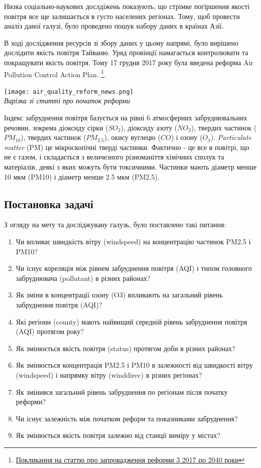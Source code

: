 \documentclass{article}
\begin{document}
Низка соціально-наукових дослдіжень показують, що стрімке погіршення якості повітря все ще залишається в густо населених регіонах. Тому, щоб провести аналіз даної галузі, було проведено пошук набору даних в країнах Азії. 

В ході дослідження ресурсів зі збору даних у цьому напрямі, було вирішено дослідити якість повітря Тайваню. Уряд провінції намагається контролювати та покращувати якість повітря. Тому 17 грудня 2017 року була введена  реформа Air Pollution Control Action Plan. \footnote{\href{https://e-info.org.tw/node/209138}{Покликання на статтю про запровадження реформи 3 2017 по 2040 роки}}.

\begin{center}
    \texttt{[image: air\_quality\_reform\_news.png]}\\
    \textit{Вирізка зі статті про початок реформи}
\end{center}

Індекс забруднення повітря базується на рівні 6 атмосферних забруднювальних речовин, зокрема діоксиду сірки ($SO_2$), діоксиду азоту ($NO_2$), твердих частинок ($PM_{10}$), твердих частинок ($PM_{2.5}$), окису вуглецю ($CO$) і озону ($O_3$). 
\textit{Particulate matter} (PM) це мікроскопічні тверді частинки. Фактично - це все в повітрі, що не є газом, і складається з величезного різноманіття хімічних сполук та матеріалів, деякі з яких можуть бути токсичними. 
Частинки мають діаметр менше 10 мкм (PM10) і діаметр менше 2.5 мкм (PM2.5).
\subsection{Постановка задачі}
З огляду на мету та досліджувану галузь, було поставлено такі питання: 

\begin{enumerate}
    \item Чи впливає швидкість вітру (windspeed) на концентрацію частинок PM2.5 і PM10?
    \item Чи існує кореляція між рівнем забруднення повітря (AQI) і типом головного забруднювача (pollutant) в різних районах?
    \item Як зміни в концентрації озону (O3) впливають на загальний рівень забруднення повітря (AQI)?
    \item Які регіони (county) мають найвищий середній рівень забруднення повітря (AQI) протягом року?
    \item Як змінюється якість повітря (status) протягом доби в різних районах?
    \item Як змінюється концентрація PM2.5 і PM10 в залежності від швидкості вітру (windspeed) і напрямку вітру (winddirec) в різних регіонах?
    \item Як змінився загальний рівень забруднення по регіонам після початку реформи? 
    \item Чи існує залежність між початком реформ та показниками забруднення? 
    \item Як змінюється якість повітря залежно від станції виміру у містах?
\end{enumerate}
\end{document}
